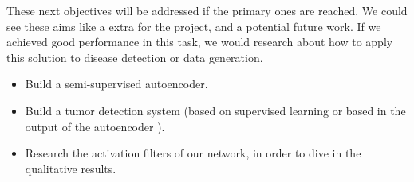These next objectives will be addressed if the primary ones are reached. We could see these aims like a extra for the project, and a potential future work. If we achieved good performance in this task, we would research about how to apply this solution to disease detection or data generation.

\begin{itemize}
    \item Build a semi-supervised autoencoder.
    \item Build a tumor detection system (based on supervised learning or based in the output of the autoencoder \cite{pinaya2019}).
    \item Research the activation filters of our network, in order to dive in the qualitative results.
\end{itemize}
